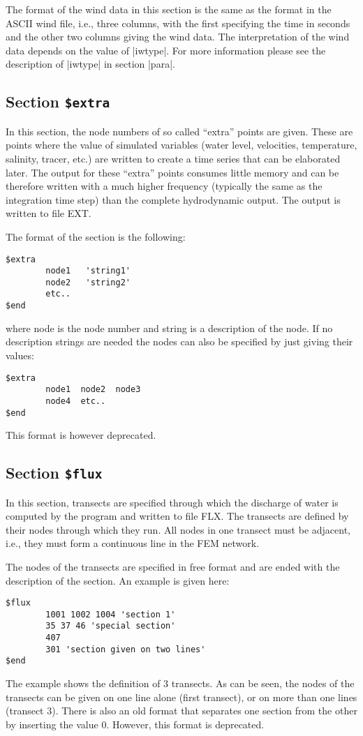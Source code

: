 The format of the wind data in this section is the same as the
format in the ASCII wind file, i.e., three columns, with
the first specifying the time in seconds and the other two columns
giving the wind data. The interpretation of the wind data
depends on the value of |iwtype|. For more information please
see the description of |iwtype| in section |para|.

\subsection{Section {\tt \$extra}}

In this section, the node numbers of so called ``extra'' points are given.
These are points where the value of simulated variables (water level,
velocities, temperature, salinity, tracer, etc.) are written to create
a time series that can be elaborated later. The output for these ``extra''
points consumes little memory and can be therefore written with a
much higher frequency (typically the same as the integration time step)
than the complete hydrodynamic output. The output is written
to file EXT.

The format of the section is the following:
\begin{verbatim}
$extra
        node1   'string1'
        node2   'string2'
        etc..
$end
\end{verbatim}
where node is the node number and string is a description of the node.
If no description strings are needed the nodes can also be specified
by just giving their values:
\begin{verbatim}
$extra
        node1  node2  node3
        node4  etc..
$end
\end{verbatim}
This format is however deprecated.


\subsection{Section {\tt \$flux}}

In this section, transects are specified through which the discharge
of water is computed by the program and written to file FLX.
The transects are defined by their nodes through which they run.
All nodes in one transect must be adjacent, i.e., they must form a
continuous line in the FEM network.

The nodes of the transects are specified in free format and are
ended with the description of the section.
An example is given here:
\begin{verbatim}
$flux
        1001 1002 1004 'section 1'
        35 37 46 'special section'
        407
        301 'section given on two lines'
$end
\end{verbatim}
The example shows the definition of 3 transects. As can be seen, the
nodes of the transects can be given on one line alone (first transect),
or on more than one lines (transect 3).
There is also an old format that separates one section from the other by
inserting the value 0. However, this format is deprecated.

